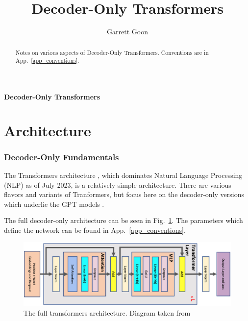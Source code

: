 \documentclass[11pt]{article}
\title{Decoder-Only Transformers}
\author{Garrett Goon}
\begin{document}
\vspace{1truecm}
%
%
\renewcommand{\thefootnote}{\fnsymbol{footnote}}
\begin{center}
	{\huge \bf{Decoder-Only Transformers}}
\end{center}


\begin{abstract}

    Notes on various aspects of Decoder-Only Transformers. Conventions are in
    App.~\ref{app_conventions}.

\end{abstract}

\tableofcontents


\renewcommand*{\thefootnote}{\arabic{footnote}}
\setcounter{footnote}{0}

\part{Architecture}

\section{Decoder-Only Fundamentals \label{sec_decoder_only} }

The Transformers architecture \cite{vaswani2017attention}, which dominates Natural Language
Processing (NLP) as of July 2023, is a relatively simple architecture. There are various flavors and
variants of Tranformers, but focus here on the decoder-only versions which underlie the
GPT models \cite{gpt2radford2019language, gpt3brown2020language, gpt4openai2023}.

The full decoder-only architecture can be seen in Fig.~\ref{fig_transformers_architecture}. The
parameters which define the network can be found in App.~\ref{app_conventions}.
\begin{figure}[ht]
	\centering
	\includegraphics[scale=0.28]{figures/transformer-general.jpg}
	\caption{The full transformers architecture. Diagram taken from \cite{korthikanti2022reducing} }
	\label{fig_transformers_architecture}
\end{figure}
\end{document}
